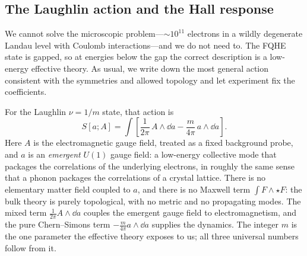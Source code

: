 \subsection{The Laughlin action and the Hall response}
\label{subsec:fqhe-action}

We cannot solve the microscopic problem---$\sim 10^{11}$ electrons in a wildly degenerate Landau level with Coulomb interactions---and we do not need to. The FQHE state is gapped, so at energies below the gap the correct description is a low-energy effective theory. As usual, we write down the most general action consistent with the symmetries and allowed topology and let experiment fix the coefficients.

For the Laughlin $\nu=1/m$ state, that action is
\begin{equation}
  S[a;A]
  =
  \int\left[
  \frac{1}{2\pi}\,A\wedge\dd a
  -
  \frac{m}{4\pi}\,a\wedge\dd a
  \right].
  \label{eq:fqhe-action}
\end{equation}
Here $A$ is the electromagnetic gauge field, treated as a fixed background probe, and $a$ is an \emph{emergent} $U(1)$ gauge field: a low-energy collective mode that packages the correlations of the underlying electrons, in roughly the same sense that a phonon packages the correlations of a crystal lattice. There is no elementary matter field coupled to $a$, and there is no Maxwell term $\int F\wedge\star F$: the bulk theory is purely topological, with no metric and no propagating modes. The mixed term $\frac{1}{2\pi}A\wedge\dd a$ couples the emergent gauge field to electromagnetism, and the pure Chern--Simons term $-\frac{m}{4\pi}a\wedge\dd a$ supplies the dynamics. The integer $m$ is the one parameter the effective theory exposes to us; all three universal numbers follow from it.


